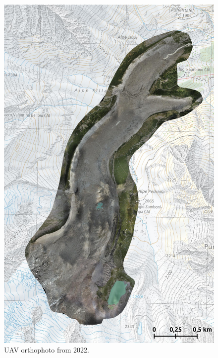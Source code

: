 \begin{figure}[p]
    \centering
    \includegraphics[height=\textheight]{figures/appendix/orto_2022.jpg}
    \caption{UAV orthophoto from 2022.}
\end{figure}

